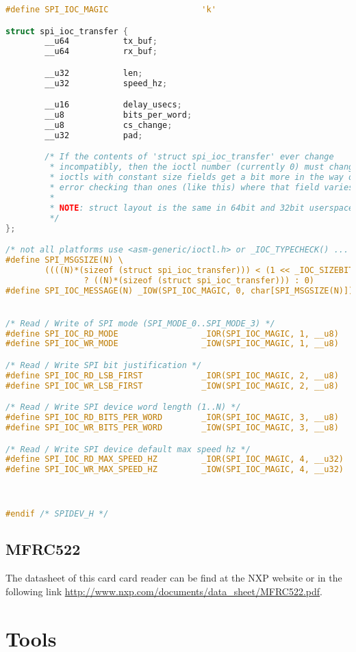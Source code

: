 \begin{lstlisting}[language=C, caption={linux/spi/spidev.h}]
#define SPI_IOC_MAGIC                   'k'

struct spi_ioc_transfer {
        __u64           tx_buf;
        __u64           rx_buf;

        __u32           len;
        __u32           speed_hz;

        __u16           delay_usecs;
        __u8            bits_per_word;
        __u8            cs_change;
        __u32           pad;

        /* If the contents of 'struct spi_ioc_transfer' ever change
         * incompatibly, then the ioctl number (currently 0) must change;
         * ioctls with constant size fields get a bit more in the way of
         * error checking than ones (like this) where that field varies.
         *
         * NOTE: struct layout is the same in 64bit and 32bit userspace.
         */
};

/* not all platforms use <asm-generic/ioctl.h> or _IOC_TYPECHECK() ... */
#define SPI_MSGSIZE(N) \
        ((((N)*(sizeof (struct spi_ioc_transfer))) < (1 << _IOC_SIZEBITS)) \
                ? ((N)*(sizeof (struct spi_ioc_transfer))) : 0)
#define SPI_IOC_MESSAGE(N) _IOW(SPI_IOC_MAGIC, 0, char[SPI_MSGSIZE(N)])


/* Read / Write of SPI mode (SPI_MODE_0..SPI_MODE_3) */
#define SPI_IOC_RD_MODE                 _IOR(SPI_IOC_MAGIC, 1, __u8)
#define SPI_IOC_WR_MODE                 _IOW(SPI_IOC_MAGIC, 1, __u8)

/* Read / Write SPI bit justification */
#define SPI_IOC_RD_LSB_FIRST            _IOR(SPI_IOC_MAGIC, 2, __u8)
#define SPI_IOC_WR_LSB_FIRST            _IOW(SPI_IOC_MAGIC, 2, __u8)

/* Read / Write SPI device word length (1..N) */
#define SPI_IOC_RD_BITS_PER_WORD        _IOR(SPI_IOC_MAGIC, 3, __u8)
#define SPI_IOC_WR_BITS_PER_WORD        _IOW(SPI_IOC_MAGIC, 3, __u8)

/* Read / Write SPI device default max speed hz */
#define SPI_IOC_RD_MAX_SPEED_HZ         _IOR(SPI_IOC_MAGIC, 4, __u32)
#define SPI_IOC_WR_MAX_SPEED_HZ         _IOW(SPI_IOC_MAGIC, 4, __u32)



#endif /* SPIDEV_H */
\end{lstlisting}

\section{MFRC522}\label{C:MFRC522}
The datasheet of this card card reader can be find at the NXP website or in the following link \url{http://www.nxp.com/documents/data_sheet/MFRC522.pdf}.
\\


\chapter{Tools}\label{C:Tools}

